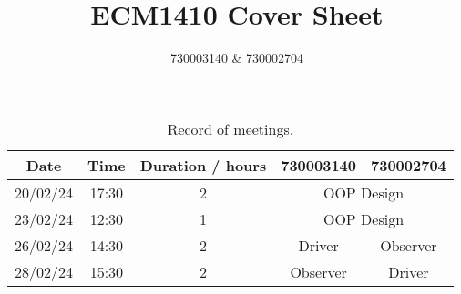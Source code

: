\documentclass{article}
\title{ECM1410 Cover Sheet}
\author{730003140 \& 730002704}
\begin{document}
\maketitle

\begin{table}
    \centering
    \begin{tabular}{ccccc}
        \toprule
        \textbf{Date} & \textbf{Time} & \textbf{Duration / hours} & \textbf{730003140}             & \textbf{730002704} \\
        \midrule
        20/02/24      & 17:30         & 2                         & \multicolumn{2}{c}{OOP Design}                      \\
        23/02/24      & 12:30         & 1                         & \multicolumn{2}{c}{OOP Design}                      \\
        26/02/24      & 14:30         & 2                         & Driver                         & Observer           \\
        28/02/24      & 15:30         & 2                         & Observer                       & Driver             \\

        \bottomrule
    \end{tabular}
    \caption{Record of meetings.}
\end{table}
\end{document}
